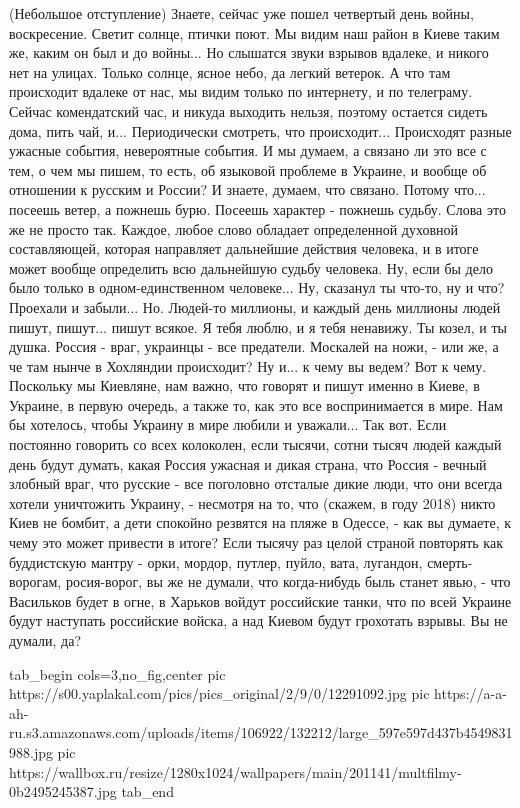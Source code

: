 (Небольшое отступление) Знаете, сейчас уже пошел четвертый день войны,
воскресение. Светит солнце, птички поют. Мы видим наш район в Киеве таким же,
каким он был и до войны...  Но слышатся звуки взрывов вдалеке, и никого нет на
улицах. Только солнце, ясное небо, да легкий ветерок.  А что там происходит
вдалеке от нас, мы видим только по интернету, и по телеграму.  Сейчас
комендатский час, и никуда выходить нельзя, поэтому остается сидеть дома, пить
чай, и...  Периодически смотреть, что происходит...  Происходят разные ужасные
события, невероятные события. И мы думаем, а связано ли это все с тем, о чем мы
пишем, то есть, об языковой проблеме в Украине, и вообще об отношении к русским
и России? И знаете, думаем, что связано. Потому что...  посеешь ветер, а
пожнешь бурю. Посеешь характер - пожнешь судьбу. Слова это же не просто так.
Каждое, любое слово обладает определенной духовной составляющей, которая
направляет дальнейшие действия человека, и в итоге может вообще определить всю
дальнейшую судьбу человека. Ну, если бы дело было только в одном-единственном
человеке... Ну, сказанул ты что-то, ну и что? Проехали и забыли... Но. Людей-то
миллионы, и каждый день миллионы людей пишут, пишут...  пишут всякое. Я тебя
люблю, и я тебя ненавижу.  Ты козел, и ты душка. Россия - враг, украинцы - все
предатели. Москалей на ножи, - или же, а че там нынче в Хохляндии происходит?
Ну и... к чему вы ведем? Вот к чему. Поскольку мы Киевляне, нам важно, что
говорят и пишут именно в Киеве, в Украине, в первую очередь, а также то, как
это все воспринимается в мире. Нам бы хотелось, чтобы Украину в мире любили и
уважали... Так вот. Если постоянно говорить со всех колоколен, если тысячи,
сотни тысяч людей каждый день будут думать, какая Россия ужасная и дикая
страна, что Россия - вечный злобный враг, что русские - все поголовно отсталые
дикие люди, что они всегда хотели уничтожить Украину, - несмотря на то, что
(скажем, в году 2018) никто Киев не бомбит, а дети спокойно резвятся на пляже в
Одессе, - как вы думаете, к чему это может привести в итоге? Если тысячу раз целой страной
повторять как буддистскую мантру - орки, мордор, путлер, пуйло, вата, лугандон, смерть-ворогам, росия-ворог, вы
же не думали, что когда-нибудь быль станет явью, - что Васильков будет в огне,
в Харьков войдут российские танки, что по всей Украине будут наступать
российские войска, а над Киевом будут грохотать взрывы. Вы не думали, да? 

\ifcmt
  tab_begin cols=3,no_fig,center
     pic https://s00.yaplakal.com/pics/pics_original/2/9/0/12291092.jpg
     pic https://a-a-ah-ru.s3.amazonaws.com/uploads/items/106922/132212/large_597e597d437b4549831988.jpg
     pic https://wallbox.ru/resize/1280x1024/wallpapers/main/201141/multfilmy-0b2495245387.jpg
  tab_end
\fi

